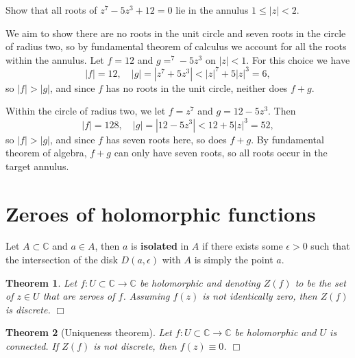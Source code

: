 \documentclass[letter-paper]{tufte-book}
\newtheorem{theorem}{\color{pastel-blue}Theorem}[section]
\newenvironment{example}[1][Example]{\begin{trivlist}
\item[\hskip \labelsep {\bfseries #1}]}{\end{trivlist}}
\newcommand{\qedwhite}{\hfill \ensuremath{\Box}}
\begin{document}
\begin{example}
  Show that all roots of $z^7 - 5z^3 + 12 = 0$ lie in the annulus $1 \leq |z| <
  2$.
  
  We aim to show there are no roots in the unit circle and seven roots in the
  circle of radius two, so by fundamental theorem of calculus we account for all
  the roots within the annulus. Let $f = 12$ and $g = ^7 - 5z^3$ on $|z| < 1$.
  For this choice we have
  \begin{equation*}
    |f| = 12, \quad |g| = |z^7 + 5z^3| < |z|^7 + 5|z|^3 = 6,
  \end{equation*}
  so $|f| > |g|$, and since $f$ has no roots in the unit circle, neither does
  $f+g$.
  
  Within the circle of radius two, we let $f = z^7$ and $g = 12 - 5z^3$. Then
  \begin{equation*}
    |f| = 128, \quad |g| = |12 - 5z^3| < 12 + 5|z|^3 = 52,
  \end{equation*}
  so $|f| > |g|$, and since $f$ has seven roots here, so does $f+g$. By
  fundamental theorem of algebra, $f+g$ can only have seven roots, so all roots
  occur in the target annulus.
\end{example}


\section{Zeroes of holomorphic functions}

Let $A\subset \mathbb{C}$ and $a\in A$, then $a$ is \textbf{isolated} in $A$ if
there exists some $\epsilon > 0$ such that the intersection of the disk $D(a,
\epsilon)$ with $A$ is simply the point $a$.

\begin{theorem}
  Let $f: U \subset \mathbb{C} \to \mathbb{C}$ be holomorphic and denoting
  $Z(f)$ to be the set of $z\in U$ that are zeroes of $f$. Assuming $f(z)$ is
  not identically zero, then $Z(f)$ is discrete. \qedwhite
\end{theorem}

\begin{theorem}[Uniqueness theorem]
   Let $f: U \subset \mathbb{C} \to \mathbb{C}$ be holomorphic and $U$ is
   connected. If $Z(f)$ is not discrete, then $f(z) \equiv 0$. \qedwhite
\end{theorem}
\end{document}
